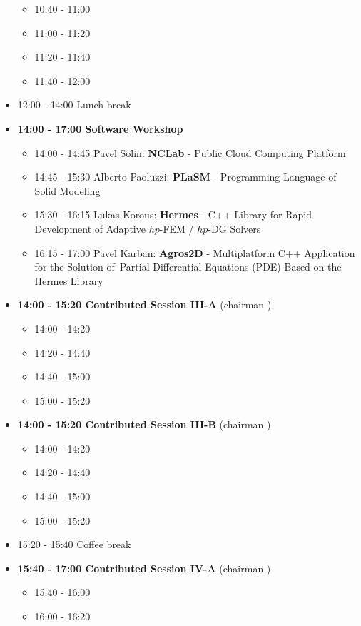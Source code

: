 \documentclass[10pt, A4]{article}%
\begin{document}
\begin{itemize}
  \begin{itemize}
    \item 10:40 - 11:00
    \item 11:00 - 11:20 
    \item 11:20 - 11:40 
    \item 11:40 - 12:00 
  \end{itemize}
  \item 12:00 - 14:00 Lunch break
  \item {\bf 14:00 - 17:00 Software Workshop}
  \begin{itemize}
    \item 14:00 - 14:45 Pavel Solin: {\bf NCLab} - Public Cloud Computing Platform
    \item 14:45 - 15:30 Alberto Paoluzzi: {\bf PLaSM} - Programming Language of Solid Modeling
    \item 15:30 - 16:15 Lukas Korous: {\bf Hermes} - C++ Library for Rapid Development of Adaptive $hp$-FEM / $hp$-DG Solvers
    \item 16:15 - 17:00 Pavel Karban: {\bf Agros2D} - Multiplatform C++ Application for the Solution of~Partial Differential Equations (PDE) Based on the Hermes Library  
  \end{itemize}
  \item {\bf 14:00 - 15:20 Contributed Session III-A} (chairman ) 
  \begin{itemize}
    \item 14:00 - 14:20 
    \item 14:20 - 14:40 
    \item 14:40 - 15:00
    \item 15:00 - 15:20  
  \end{itemize}
  \item {\bf 14:00 - 15:20 Contributed Session III-B} (chairman ) 
  \begin{itemize}
    \item 14:00 - 14:20 
    \item 14:20 - 14:40 
    \item 14:40 - 15:00
    \item 15:00 - 15:20  
  \end{itemize}
  \item 15:20 - 15:40 Coffee break
  \item {\bf 15:40 - 17:00 Contributed Session IV-A} (chairman ) 
  \begin{itemize}
    \item 15:40 - 16:00
    \item 16:00 - 16:20 

\end{itemize}
\end{itemize}
\end{document}
